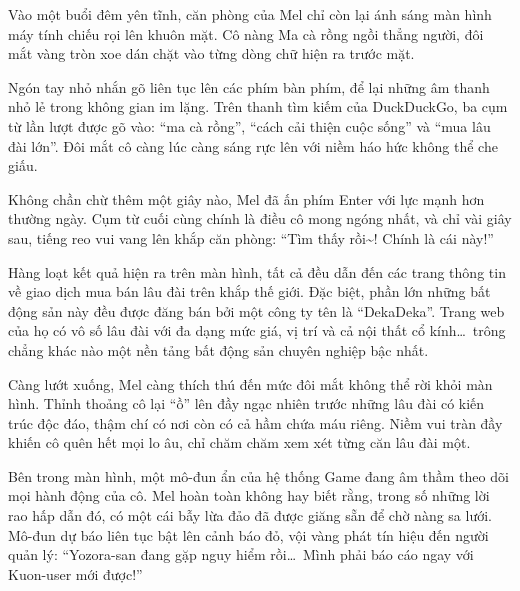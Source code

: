 \documentclass[../main.tex]{subfiles}
\begin{document}

Vào một buổi đêm yên tĩnh, căn phòng của Mel chỉ còn lại ánh sáng màn hình máy tính chiếu rọi lên khuôn mặt. Cô nàng Ma cà rồng ngồi thẳng người, đôi mắt vàng tròn xoe dán chặt vào từng dòng chữ hiện ra trước mặt.


Ngón tay nhỏ nhắn gõ liên tục lên các phím bàn phím, để lại những âm thanh nhỏ lẻ trong không gian im lặng. Trên thanh tìm kiếm của DuckDuckGo, ba cụm từ lần lượt được gõ vào: ``ma cà rồng'', ``cách cải thiện cuộc sống'' và ``mua lâu đài lớn''. Đôi mắt cô càng lúc càng sáng rực lên với niềm háo hức không thể che giấu.

Không chần chừ thêm một giây nào, Mel đã ấn phím Enter với lực mạnh hơn thường ngày. Cụm từ cuối cùng chính là điều cô mong ngóng nhất, và chỉ vài giây sau, tiếng reo vui vang lên khắp căn phòng: ``Tìm thấy rồi\~{}! Chính là cái này!''

Hàng loạt kết quả hiện ra trên màn hình, tất cả đều dẫn đến các trang thông tin về giao dịch mua bán lâu đài trên khắp thế giới. Đặc biệt, phần lớn những bất động sản này đều được đăng bán bởi một công ty tên là ``DekaDeka''. Trang web của họ có vô số lâu đài với đa dạng mức giá, vị trí và cả nội thất cổ kính\dots\ trông chẳng khác nào một nền tảng bất động sản chuyên nghiệp bậc nhất.

Càng lướt xuống, Mel càng thích thú đến mức đôi mắt không thể rời khỏi màn hình. Thỉnh thoảng cô lại ``ồ'' lên đầy ngạc nhiên trước những lâu đài có kiến trúc độc đáo, thậm chí có nơi còn có cả hầm chứa máu riêng. Niềm vui tràn đầy khiến cô quên hết mọi lo âu, chỉ chăm chăm xem xét từng căn lâu đài một.

Bên trong màn hình, một mô-đun ẩn của hệ thống Game đang âm thầm theo dõi mọi hành động của cô. Mel hoàn toàn không hay biết rằng, trong số những lời rao hấp dẫn đó, có một cái bẫy lừa đảo đã được giăng sẵn để chờ nàng sa lưới. Mô-đun dự báo liên tục bật lên cảnh báo đỏ, vội vàng phát tín hiệu đến người quản lý: ``Yozora-san đang gặp nguy hiểm rồi\dots\ Mình phải báo cáo ngay với Kuon-user mới được!''
\end{document}

